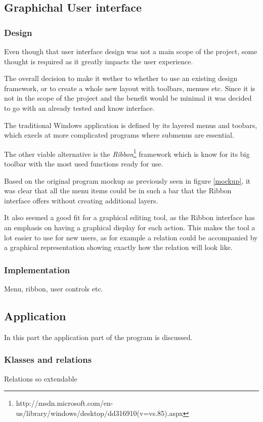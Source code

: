 \subsection{Graphichal User interface}

\subsubsection{Design}

Even though that
user interface design was not a main scope of the project, some thought is
required as it greatly impacts the user experience. 

The overall decision to make it wether to whether to use an existing design
framework, or to create a whole new layout with toolbars, menues etc. Since it
is not in the scope of the project and the benefit would be minimal it was
decided to go with an already tested and know interface. 

The traditional Windows application is defined by its layered menus and toobars,
which execls at more complicated programs where submenus are essential.

The other viable alternative is the
\textit{Ribbon}\footnote{http://msdn.microsoft.com/en-us/library/windows/desktop/dd316910(v=vs.85).aspx}
framework which is know for its big toolbar with the most used functions ready
for use.

Based on the original program mockup as previously seen in figure \ref{mockup},
it was clear that all the menu items could be in such a bar that the Ribbon
interface offers without creating additional layers.

It also seemed a good fit for a graphical editing tool, as the Ribbon interface
has an emphasis on having a graphical display for each action. This makes the
tool a lot easier to use for new users, as for example a relation could be
accompanied by a graphical representation showing exactly how the relation will
look like.  \subsubsection{Implementation} Menu, ribbon, user controls etc.


\subsection{Application}
In this part the application part of the program is discussed.

\subsubsection{Klasses and relations}
Relations so extendable

